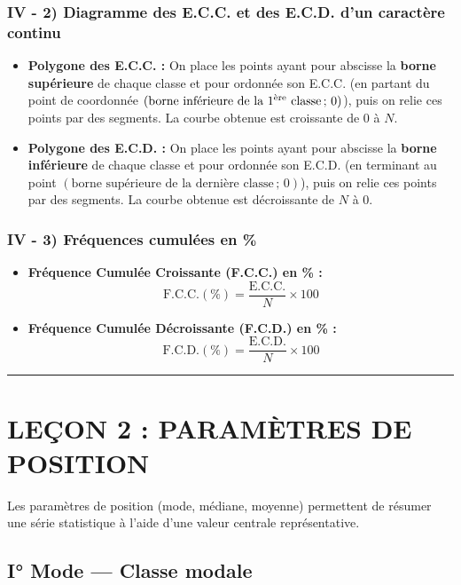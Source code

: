 \documentclass[11pt, a4paper]{article}
\begin{document}
\subsubsection*{IV - 2) Diagramme des E.C.C. et des E.C.D. d'un caractère continu}
\begin{itemize}
    \item \textbf{Polygone des E.C.C. :} On place les points ayant pour abscisse la \textbf{borne supérieure} de chaque classe et pour ordonnée son E.C.C. (en partant du point de coordonnée $(\text{borne inférieure de la 1\textsuperscript{ère} classe} \,;\, 0)$), puis on relie ces points par des segments. La courbe obtenue est croissante de $0$ à $N$.
    \item \textbf{Polygone des E.C.D. :} On place les points ayant pour abscisse la \textbf{borne inférieure} de chaque classe et pour ordonnée son E.C.D. (en terminant au point $(\text{borne supérieure de la dernière classe} \,;\, 0)$), puis on relie ces points par des segments. La courbe obtenue est décroissante de $N$ à $0$.
\end{itemize}

\subsubsection*{IV - 3) Fréquences cumulées en \%}
\begin{itemize}
    \item \textbf{Fréquence Cumulée Croissante (F.C.C.) en \% :}
    \[
        \text{F.C.C.}(\%) = \frac{\text{E.C.C.}}{N} \times 100
    \]
    \item \textbf{Fréquence Cumulée Décroissante (F.C.D.) en \% :}
    \[
        \text{F.C.D.}(\%) = \frac{\text{E.C.D.}}{N} \times 100
    \]
\end{itemize}

\vspace{0.5cm}
\hrule
\vspace{0.5cm}

\section*{\textcolor{accent}{LEÇON 2 : PARAMÈTRES DE POSITION}}

Les paramètres de position (mode, médiane, moyenne) permettent de résumer une série statistique à l'aide d'une valeur centrale représentative.

\subsection*{\textcolor{primary}{I° Mode — Classe modale}}
\end{document}
